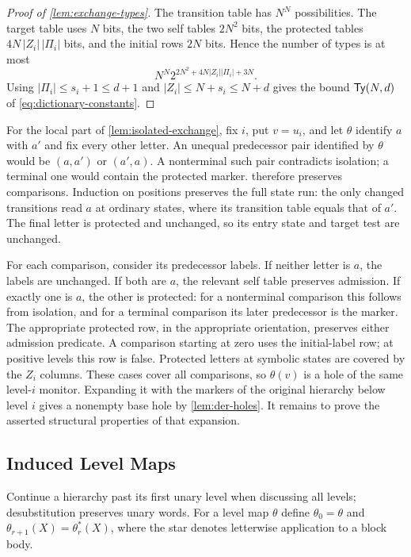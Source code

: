 \begin{proof}[Proof of \cref{lem:exchange-types}]
The transition table has $N^N$ possibilities. The target table uses $N$
bits, the two self tables $2N^2$ bits, the protected tables
$4N\,|Z_i|\,|\Pi_i|$ bits, and the initial rows $2N$ bits. Hence the number
of types is at most
\[
 N^N2^{2N^2+4N|Z_i||\Pi_i|+3N}.
\]
Using $|\Pi_i|\le s_i+1\le d+1$ and $|Z_i|\le N+s_i\le N+d$ gives the bound
$\mathsf{Ty}(N,d)$ of \eqref{eq:dictionary-constants}.
\end{proof}

For the local part of \cref{lem:isolated-exchange}, fix $i$, put $v=u_i$,
and let $\theta$ identify $a$ with $a'$ and fix every other letter.
An unequal predecessor pair identified by $\theta$ would be $(a,a')$ or
$(a',a)$. A nonterminal such pair contradicts isolation; a terminal one
would contain the protected marker.  therefore
preserves comparisons. Induction on positions preserves the full state
run: the only changed transitions read $a$ at ordinary states, where its
transition table equals that of $a'$. The final letter is protected and
unchanged, so its entry state and target test are unchanged.

For each comparison, consider its predecessor labels. If neither letter
is $a$, the labels are unchanged. If both are $a$, the relevant self table
preserves admission. If exactly one is $a$, the other is protected:
for a nonterminal comparison this follows from isolation, and for a
terminal comparison its later predecessor is the marker. The appropriate
protected row, in the appropriate orientation, preserves either admission
predicate. A comparison starting at zero uses the initial-label row;
at positive levels this row is false. Protected letters at symbolic
states are covered by the $Z_i$ columns. These cases cover all comparisons,
so $\theta(v)$ is a hole of the same level-$i$ monitor. Expanding it with the
markers of the original hierarchy below level $i$ gives a nonempty base hole
by \cref{lem:der-holes}.
It remains to prove the asserted structural properties of that expansion.

\subsection{Induced Level Maps}

Continue a hierarchy past its first unary level when discussing all
levels; desubstitution preserves unary words. For a level map $\theta$ define
$\theta_0=\theta$ and $\theta_{r+1}(X)=\theta_r^*(X)$, where the star denotes letterwise
application to a block body.

